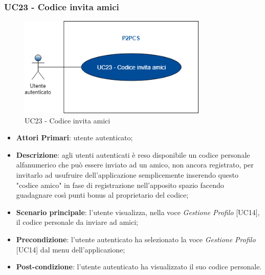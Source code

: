 \subsubsection{UC23 - Codice invita amici}
\begin{figure}[h]
	\includegraphics[width=9cm]{res/images/UC23Codiceamico.png}
	\centering
	\caption{UC23 - Codice invita amici}
\end{figure}
\begin{itemize}
	\item \textbf{Attori Primari}: utente autenticato;
	\item \textbf{Descrizione}: agli utenti autenticati è reso disponibile un codice personale alfanumerico che può essere inviato ad un amico, non ancora registrato, per invitarlo ad usufruire dell'applicazione semplicemente inserendo questo "codice amico" in fase di registrazione nell'apposito spazio facendo guadagnare così punti bonus al proprietario del codice;
	\item \textbf{Scenario principale}: l'utente visualizza, nella voce \textit{Gestione Profilo} [UC14], il codice personale da inviare ad amici;
	\item \textbf{Precondizione}: l'utente autenticato ha selezionato la voce \textit{Gestione Profilo} [UC14] dal menu dell'applicazione;
	\item \textbf{Post-condizione}: l'utente autenticato ha visualizzato il suo codice personale. 
\end{itemize} 

